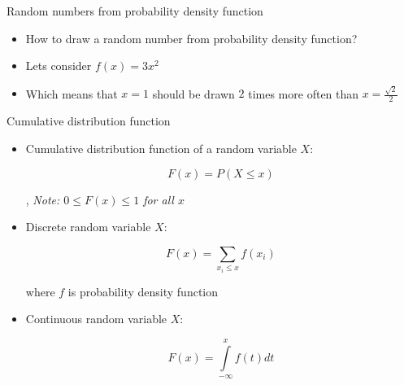 \begin{slide}[toc=Random from PDF]{Random numbers from probability density function}
\null\vfill

  \twocolumn
  {
    \begin{itemize}
      \item How to draw a random number from probability density function?
      \item Lets consider $f(x) = 3x^2$
      \item Which means that $x = 1$ should be drawn $2$ times more often than $x = \frac{\sqrt{2}}{2}$
    \end{itemize}
  }
  {
    
  }

\vfill\null
\end{slide}

\begin{slide}[toc=CDF]{Cumulative distribution function}
\null\vfill

  \begin{itemize}
    
    \item Cumulative distribution function of a random variable $X$:
    
    $$F(x) = P (X \leq x)$$
    
    \sep
    {\it\color{pdcolor3} Note: $0 \leq F(x) \leq 1$ for all $x$}
        
    \item Discrete random variable $X$:
    
    $$F (x) = \sum\limits_{x_i \leq x} f (x_i)$$

    where $f$ is probability density function
    
    \item Continuous random variable $X$:
    
    $$F (x) = \int\limits_{-\infty}^{x} f (t) dt$$ 
        
  \end{itemize}

\vfill\null
\end{slide}


